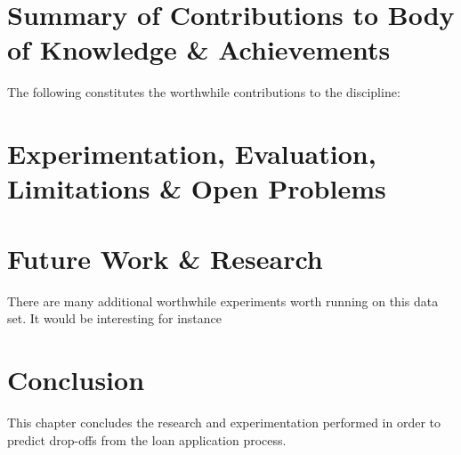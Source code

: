 \section{Summary of Contributions to Body of Knowledge \& Achievements}
The following constitutes the worthwhile contributions to the discipline:


\section{Experimentation, Evaluation, Limitations \& Open Problems}


\section{Future Work \& Research}
There are many additional worthwhile experiments worth running on this data set. It would be interesting for instance



\section{Conclusion}
This chapter concludes the research and experimentation performed in order to predict drop-offs from the loan application process. 

